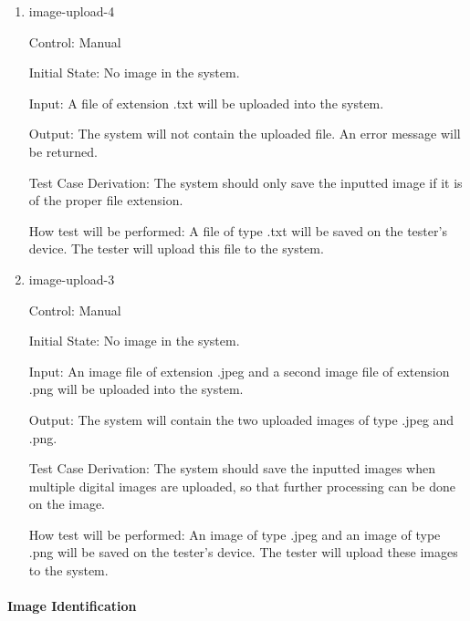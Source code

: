 \documentclass[12pt, titlepage]{article}
\begin{document}
\begin{enumerate}
		\item{image-upload-4\\}
		
		Control: Manual
		
		Initial State: No image in the system.
		
		Input: A file of extension .txt will be uploaded into the system.
		
		Output: The system will not contain the uploaded file. An error message will be returned.
		
		Test Case Derivation: The system should only save the inputted image if it is of the proper file extension.
		
		How test will be performed: A file of type .txt will be saved on the tester's device. The tester will upload this file to the system.
		
		\item{image-upload-3\\}
		
		Control: Manual
		
		Initial State: No image in the system.
		
		Input: An image file of extension .jpeg and a second image file of extension .png will be uploaded into the system.
		
		Output: The system will contain the two uploaded images of type .jpeg and .png.
		
		Test Case Derivation: The system should save the inputted images when multiple digital images are uploaded, so that further processing can be done on the image.
		
		How test will be performed: An image of type .jpeg and an image of type .png will be saved on the tester's device. The tester will upload these images to the system.
		
	\end{enumerate}
	
	\paragraph{Image Identification}
	
\end{document}
